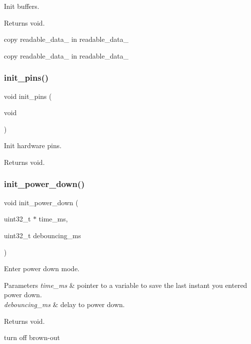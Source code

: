 Init buffers. 

\begin{DoxyReturn}{Returns}
void. 
\end{DoxyReturn}
copy readable\+\_\+data\+\_ in readable\+\_\+data\+\_

copy readable\+\_\+data\+\_ in readable\+\_\+data\+\_ \mbox{\label{rmap_8ino_ad8b80a0c08f928106018edd6ea435b95}} 
\subsubsection{\texorpdfstring{init\+\_\+pins()}{init\_pins()}}
{\footnotesize\ttfamily void init\+\_\+pins (\begin{DoxyParamCaption}\item[{void}]{ }\end{DoxyParamCaption})}



Init hardware pins. 

\begin{DoxyReturn}{Returns}
void. 
\end{DoxyReturn}
\mbox{\label{rmap_8ino_afb98a0f07c30784284f48271ffe02b97}} 
\subsubsection{\texorpdfstring{init\+\_\+power\+\_\+down()}{init\_power\_down()}}
{\footnotesize\ttfamily void init\+\_\+power\+\_\+down (\begin{DoxyParamCaption}\item[{uint32\+\_\+t $\ast$}]{time\+\_\+ms,  }\item[{uint32\+\_\+t}]{debouncing\+\_\+ms }\end{DoxyParamCaption})}



Enter power down mode. 


\begin{DoxyParams}{Parameters}
{\em time\+\_\+ms} & pointer to a variable to save the last instant you entered power down. \\
\hline
{\em debouncing\+\_\+ms} & delay to power down. \\
\hline
\end{DoxyParams}
\begin{DoxyReturn}{Returns}
void. 
\end{DoxyReturn}
turn off brown-\/out

